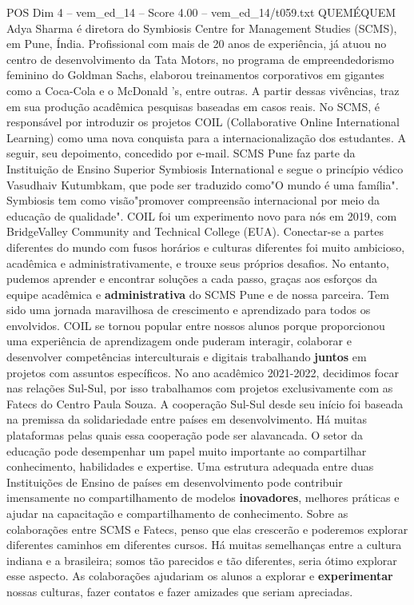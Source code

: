 \begin{textsample}{POS Dim 4 – vem\_ed\_14 – Score 4.00 – vem\_ed\_14/t059.txt}  \label{ex:f4_pos_148}
QUEMÉQUEM Adya Sharma é diretora do Symbiosis Centre for Management Studies (SCMS), em Pune, Índia.
Profissional com mais de 20 anos de experiência, já atuou no centro de desenvolvimento da Tata Motors, no programa de empreendedorismo feminino do Goldman Sachs, elaborou treinamentos corporativos em gigantes como a Coca-Cola e o McDonald 's, entre outras.
A partir dessas vivências, traz em sua produção acadêmica pesquisas baseadas em casos reais.
No SCMS, é responsável por introduzir os projetos COIL (Collaborative Online International Learning) como uma nova conquista para a internacionalização dos estudantes.
A seguir, seu depoimento, concedido por e-mail.
SCMS Pune faz parte da Instituição de Ensino Superior Symbiosis International e segue o princípio védico Vasudhaiv Kutumbkam, que pode ser traduzido como"O mundo é uma família".
Symbiosis tem como visão"promover compreensão internacional por meio da educação de qualidade".
COIL foi um experimento novo para nós em 2019, com BridgeValley Community and Technical College (EUA).
Conectar-se a partes diferentes do mundo com fusos horários e culturas diferentes foi muito ambicioso, acadêmica e administrativamente, e trouxe seus próprios desafios.
No entanto, pudemos aprender e encontrar soluções a cada passo, graças aos esforços da equipe acadêmica e \textbf{administrativa} do SCMS Pune e de nossa parceira.
Tem sido uma jornada maravilhosa de crescimento e aprendizado para todos os envolvidos.
COIL se tornou popular entre nossos alunos porque proporcionou uma experiência de aprendizagem onde puderam interagir, colaborar e desenvolver competências interculturais e digitais trabalhando \textbf{juntos} em projetos com assuntos específicos.
No ano acadêmico 2021-2022, decidimos focar nas relações Sul-Sul, por isso trabalhamos com projetos exclusivamente com as Fatecs do Centro Paula Souza.
A cooperação Sul-Sul desde seu início foi baseada na premissa da solidariedade entre países em desenvolvimento.
Há muitas plataformas pelas quais essa cooperação pode ser alavancada.
O setor da educação pode desempenhar um papel muito importante ao compartilhar conhecimento, habilidades e expertise.
Uma estrutura adequada entre duas Instituições de Ensino de países em desenvolvimento pode contribuir imensamente no compartilhamento de modelos \textbf{inovadores}, melhores práticas e ajudar na capacitação e compartilhamento de conhecimento.
Sobre as colaborações entre SCMS e Fatecs, penso que elas crescerão e poderemos explorar diferentes caminhos em diferentes cursos.
Há muitas semelhanças entre a cultura indiana e a brasileira; somos tão parecidos e tão diferentes, seria ótimo explorar esse aspecto.
As colaborações ajudariam os alunos a explorar e \textbf{experimentar} nossas culturas, fazer contatos e fazer amizades que seriam apreciadas.

\end{textsample}
